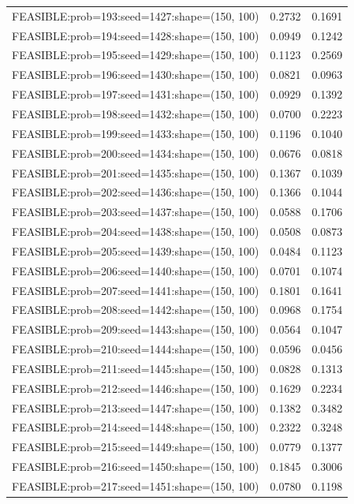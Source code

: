 \begin{longtable}{lcc}
FEASIBLE:prob=193:seed=1427:shape=(150, 100) &   0.2732 & 0.1691 \\
FEASIBLE:prob=194:seed=1428:shape=(150, 100) &   0.0949 & 0.1242 \\
FEASIBLE:prob=195:seed=1429:shape=(150, 100) &   0.1123 & 0.2569 \\
FEASIBLE:prob=196:seed=1430:shape=(150, 100) &   0.0821 & 0.0963 \\
FEASIBLE:prob=197:seed=1431:shape=(150, 100) &   0.0929 & 0.1392 \\
FEASIBLE:prob=198:seed=1432:shape=(150, 100) &   0.0700 & 0.2223 \\
FEASIBLE:prob=199:seed=1433:shape=(150, 100) &   0.1196 & 0.1040 \\
FEASIBLE:prob=200:seed=1434:shape=(150, 100) &   0.0676 & 0.0818 \\
FEASIBLE:prob=201:seed=1435:shape=(150, 100) &   0.1367 & 0.1039 \\
FEASIBLE:prob=202:seed=1436:shape=(150, 100) &   0.1366 & 0.1044 \\
FEASIBLE:prob=203:seed=1437:shape=(150, 100) &   0.0588 & 0.1706 \\
FEASIBLE:prob=204:seed=1438:shape=(150, 100) &   0.0508 & 0.0873 \\
FEASIBLE:prob=205:seed=1439:shape=(150, 100) &   0.0484 & 0.1123 \\
FEASIBLE:prob=206:seed=1440:shape=(150, 100) &   0.0701 & 0.1074 \\
FEASIBLE:prob=207:seed=1441:shape=(150, 100) &   0.1801 & 0.1641 \\
FEASIBLE:prob=208:seed=1442:shape=(150, 100) &   0.0968 & 0.1754 \\
FEASIBLE:prob=209:seed=1443:shape=(150, 100) &   0.0564 & 0.1047 \\
FEASIBLE:prob=210:seed=1444:shape=(150, 100) &   0.0596 & 0.0456 \\
FEASIBLE:prob=211:seed=1445:shape=(150, 100) &   0.0828 & 0.1313 \\
FEASIBLE:prob=212:seed=1446:shape=(150, 100) &   0.1629 & 0.2234 \\
FEASIBLE:prob=213:seed=1447:shape=(150, 100) &   0.1382 & 0.3482 \\
FEASIBLE:prob=214:seed=1448:shape=(150, 100) &   0.2322 & 0.3248 \\
FEASIBLE:prob=215:seed=1449:shape=(150, 100) &   0.0779 & 0.1377 \\
FEASIBLE:prob=216:seed=1450:shape=(150, 100) &   0.1845 & 0.3006 \\
FEASIBLE:prob=217:seed=1451:shape=(150, 100) &   0.0780 & 0.1198 \\

\end{longtable}
